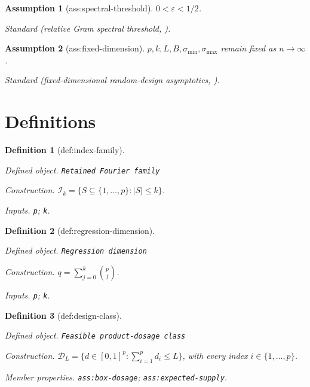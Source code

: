 \documentclass{article}
\newtheorem{assumption}{Assumption}
\newtheorem{definition}{Definition}
\begin{document}
\begin{assumption}[ass:spectral-threshold]\label{ass:spectral-threshold}
\(0<\varepsilon<1/2\).
\par\smallskip\noindent\emph{Standard} (relative Gram spectral threshold, \cite{Tropp2012}).
\end{assumption}

\begin{assumption}[ass:fixed-dimension]\label{ass:fixed-dimension}
\(p,k,L,B,\sigma_{\min},\sigma_{\max}\) remain fixed as \(n\to\infty\).
\par\smallskip\noindent\emph{Standard} (fixed-dimensional random-design asymptotics, \cite{HsuKakadeZhang2014}).
\end{assumption}

\section{Definitions}

\begin{definition}[def:index-family]\label{def:index-family}
\par\smallskip\noindent\emph{Defined object.} \texttt{Retained Fourier family}
\par\smallskip\noindent\emph{Construction.} \(\mathcal I_k=\{S\subseteq\{1,\ldots,p\}:|S|\le k\}\).
\par\smallskip\noindent\emph{Inputs.} \texttt{p}; \texttt{k}.
\end{definition}

\begin{definition}[def:regression-dimension]\label{def:regression-dimension}
\par\smallskip\noindent\emph{Defined object.} \texttt{Regression dimension}
\par\smallskip\noindent\emph{Construction.} \(q=\sum_{j=0}^{k}\binom pj\).
\par\smallskip\noindent\emph{Inputs.} \texttt{p}; \texttt{k}.
\end{definition}

\begin{definition}[def:design-class]\label{def:design-class}
\par\smallskip\noindent\emph{Defined object.} \texttt{Feasible product-\allowbreak{}dosage class}
\par\smallskip\noindent\emph{Construction.} \(\mathcal D_L=\{d\in[0,1]^p: \sum_{i=1}^p d_i\le L\}\), with every index \(i\in\{1,\ldots,p\}\).
\par\smallskip\noindent\emph{Member properties.} \texttt{ass:\allowbreak{}box-\allowbreak{}dosage}; \texttt{ass:\allowbreak{}expected-\allowbreak{}supply}.
\end{definition}
\end{document}
